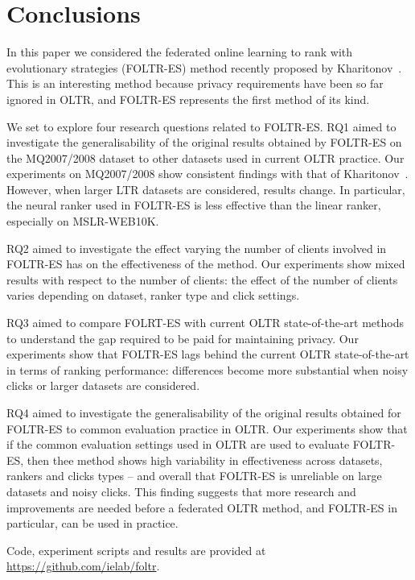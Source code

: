 \section{Conclusions}

In this paper we considered the federated online learning to rank with evolutionary strategies (FOLTR-ES) method recently proposed by Kharitonov~\cite{kharitonov2019federated}. This is an interesting method because privacy requirements have been so far ignored in OLTR, and FOLTR-ES represents the first method of its kind. 

We set to explore four research questions related to FOLTR-ES. RQ1 aimed to investigate the generalisability of the original results obtained by FOLTR-ES on the MQ2007/2008 dataset to other datasets used in current OLTR practice. Our  experiments on MQ2007/2008 show consistent findings with that of Kharitonov~\cite{kharitonov2019federated}. However, when larger LTR datasets are considered, results change. In particular, the neural ranker used in FOLTR-ES is less effective than the linear ranker, especially on MSLR-WEB10K. %

RQ2 aimed to investigate the effect varying the number of clients involved in FOLTR-ES has on the effectiveness of the method. %
Our experiments show mixed results with respect to the number of clients: the effect of the number of clients varies depending on dataset, ranker type and click settings. 

RQ3 aimed to compare FOLRT-ES with current OLTR state-of-the-art methods to understand the gap required to be paid for maintaining privacy. Our experiments show that FOLTR-ES lags behind the current OLTR state-of-the-art in terms of ranking performance: differences become more substantial when noisy clicks or larger datasets are considered. 

RQ4 aimed to investigate the generalisability of the original results obtained for FOLTR-ES to common evaluation practice in OLTR. Our experiments show that if the common evaluation settings used in OLTR are used to evaluate FOLTR-ES, then thee method shows high variability in effectiveness across datasets, rankers and clicks types -- and overall that FOLTR-ES is unreliable on large datasets and noisy clicks. This finding suggests that more research and improvements are needed before a federated OLTR method, and FOLTR-ES in particular, can be used in practice. 

Code, experiment scripts and results are provided at \url{https://github.com/ielab/foltr}. 


